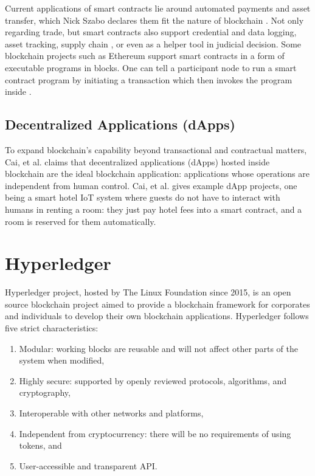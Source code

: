 \documentclass[a4paper,12pt,oneside, utf8x]{report}
\begin{document}
Current applications of smart contracts lie around automated payments and asset transfer, which Nick Szabo declares them fit the nature of blockchain \cite{a23}. Not only regarding trade, but smart contracts also support credential and data logging, asset tracking, supply chain \cite{a23}, or even as a helper tool in judicial decision. Some blockchain projects such as Ethereum support smart contracts in a form of executable programs in blocks. One can tell a participant node to run a smart contract program by initiating a transaction which then invokes the program inside \cite{a24}.

\subsection{Decentralized Applications (dApps)}
To expand blockchain’s capability beyond transactional and contractual matters, Cai, et al. \cite{a24} claims that decentralized applications (dApps) hosted inside blockchain are the ideal blockchain application: applications whose operations are independent from human control. Cai, et al. gives example dApp projects, one being a smart hotel IoT system where guests do not have to interact with humans in renting a room: they just pay hotel fees into a smart contract, and a room is reserved for them automatically.

\section{Hyperledger \cite{a25}}
Hyperledger project, hosted by The Linux Foundation since 2015, is an open source blockchain project aimed to provide a blockchain framework for corporates and individuals to develop their own blockchain applications. Hyperledger follows five strict characteristics:
\begin{enumerate}
\item Modular: working blocks are reusable and will not affect other parts of the system when modified,
\item Highly secure: supported by openly reviewed protocols, algorithms, and cryptography,
\item Interoperable with other networks and platforms,
\item Independent from cryptocurrency: there will be no requirements of using tokens, and
\item User-accessible and transparent API.
\end{enumerate}
\end{document}

